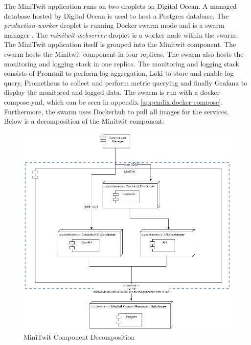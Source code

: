 The MiniTwit application runs on two droplets on Digital Ocean. A managed database hosted by Digital Ocean is used to host a Postgres database. The \textit{production-worker} droplet is running Docker swarm mode and is a swarm manager \cite{docker-swarm}. The \textit{minitwit-webserver} droplet is a worker node within the swarm. The MiniTwit application itself is grouped into the Minitwit component. The swarm hosts the Minitwit component in four replicas. The swarm also hosts the monitoring and logging stack in one replica. The monitoring and logging stack consists of Promtail to perform log aggregation, Loki to store and enable log query, Prometheus to collect and perform metric querying and finally Grafana to display the monitored and logged data. The swarm is run with a docker-compose.yml, which can be seen in appendix \ref{appendix:docker-compose}. \\
Furthermore, the swarm uses Dockerhub to pull all images for the services.
\\
Below is a decomposition of the Minitwit component:

\begin{figure}[h!]
    \centering
    \includegraphics[width=1.1\linewidth]{report/images/minitwit-decomposition.png}
    \caption{MiniTwit Component Decomposition}
    \label{fig:arcitechture-overview}
\end{figure}

